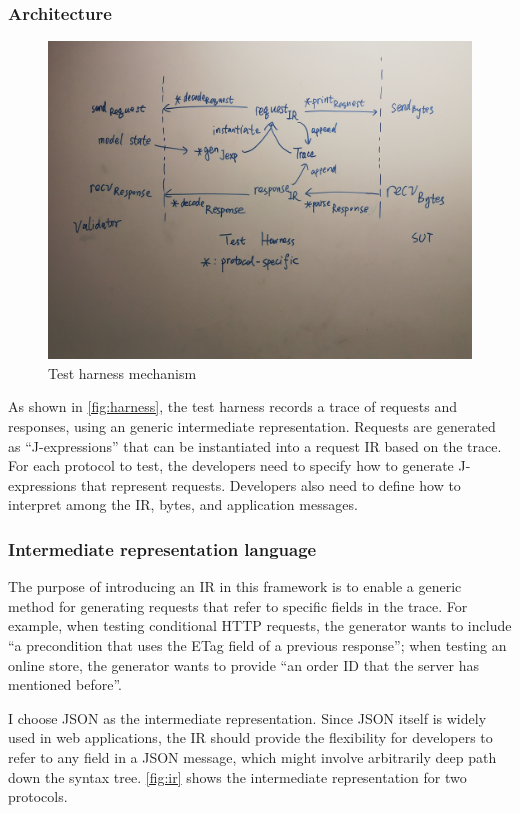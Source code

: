 \documentclass{article}
\theoremstyle{definition}
\begin{document}
\subsubsection{Architecture}
\begin{figure}
  \centering
  \includegraphics[width=.8\textwidth]{figures/harness}
  \caption{Test harness mechanism}
  \label{fig:harness}
\end{figure}

As shown in \autoref{fig:harness}, the test harness records a trace of requests
and responses, using an generic intermediate representation.  Requests are
generated as ``J-expressions'' that can be instantiated into a request IR based
on the trace.  For each protocol to test, the developers need to specify how to
generate J-expressions that represent requests.  Developers also need to define
how to interpret among the IR, bytes, and application messages.

\subsubsection{Intermediate representation language}
The purpose of introducing an IR in this framework is to enable a generic method
for generating requests that refer to specific fields in the trace.  For
example, when testing conditional HTTP requests, the generator wants to include
``a precondition that uses the ETag field of a previous response''; when testing
an online store, the generator wants to provide ``an order ID that the server
has mentioned before''.

I choose JSON as the intermediate representation.  Since JSON itself is widely
used in web applications, the IR should provide the flexibility for developers
to refer to any field in a JSON message, which might involve arbitrarily deep
path down the syntax tree.  \autoref{fig:ir} shows the intermediate
representation for two protocols.
\end{document}
